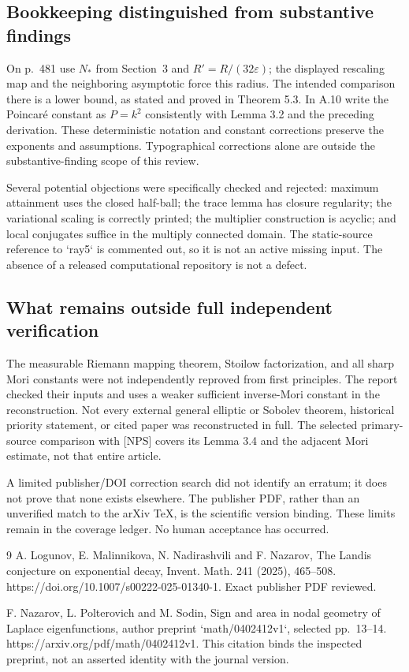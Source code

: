 \documentclass[10pt]{article}
\begin{document}
\subsection*{Bookkeeping distinguished from substantive findings}
On p. 481 use \(N_*\) from Section 3 and \(R'=R/(32\varepsilon)\); the displayed rescaling map and the neighboring asymptotic force this radius. The intended comparison there is a lower bound, as stated and proved in Theorem 5.3. In A.10 write the Poincaré constant as \(P=k^2\) consistently with Lemma 3.2 and the preceding derivation. These deterministic notation and constant corrections preserve the exponents and assumptions. Typographical corrections alone are outside the substantive-finding scope of this review.\par
Several potential objections were specifically checked and rejected: maximum attainment uses the closed half-ball; the trace lemma has closure regularity; the variational scaling is correctly printed; the multiplier construction is acyclic; and local conjugates suffice in the multiply connected domain. The static-source reference to `ray5` is commented out, so it is not an active missing input. The absence of a released computational repository is not a defect.\par
\subsection*{What remains outside full independent verification}
The measurable Riemann mapping theorem, Stoilow factorization, and all sharp Mori constants were not independently reproved from first principles. The report checked their inputs and uses a weaker sufficient inverse-Mori constant in the reconstruction. Not every external general elliptic or Sobolev theorem, historical priority statement, or cited paper was reconstructed in full. The selected primary-source comparison with [NPS] covers its Lemma 3.4 and the adjacent Mori estimate, not that entire article.\par
A limited publisher/DOI correction search did not identify an erratum; it does not prove that none exists elsewhere. The publisher PDF, rather than an unverified match to the arXiv TeX, is the scientific version binding. These limits remain in the coverage ledger. No human acceptance has occurred.\par
9 A. Logunov, E. Malinnikova, N. Nadirashvili and F. Nazarov, The Landis conjecture on exponential decay, Invent. Math. 241 (2025), 465–508. https://doi.org/10.1007/s00222-025-01340-1. Exact publisher PDF reviewed.\par
F. Nazarov, L. Polterovich and M. Sodin, Sign and area in nodal geometry of Laplace eigenfunctions, author preprint `math/0402412v1`, selected pp. 13–14. https://arxiv.org/pdf/math/0402412v1. This citation binds the inspected preprint, not an asserted identity with the journal version.\par
\end{document}

